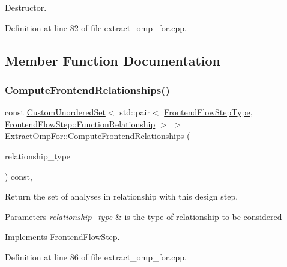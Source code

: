 Destructor. 



Definition at line 82 of file extract\+\_\+omp\+\_\+for.\+cpp.



\subsection{Member Function Documentation}
\mbox{\label{classExtractOmpFor_a915e472b3f29a1dd3aab7b9ef2cb8e83}} 
\subsubsection{\texorpdfstring{Compute\+Frontend\+Relationships()}{ComputeFrontendRelationships()}}
{\footnotesize\ttfamily const \hyperlink{classCustomUnorderedSet}{Custom\+Unordered\+Set}$<$ std\+::pair$<$ \hyperlink{frontend__flow__step_8hpp_afeb3716c693d2b2e4ed3e6d04c3b63bb}{Frontend\+Flow\+Step\+Type}, \hyperlink{classFrontendFlowStep_af7cf30f2023e5b99e637dc2058289ab0}{Frontend\+Flow\+Step\+::\+Function\+Relationship} $>$ $>$ Extract\+Omp\+For\+::\+Compute\+Frontend\+Relationships (\begin{DoxyParamCaption}\item[{const \hyperlink{classDesignFlowStep_a723a3baf19ff2ceb77bc13e099d0b1b7}{Design\+Flow\+Step\+::\+Relationship\+Type}}]{relationship\+\_\+type }\end{DoxyParamCaption}) const\hspace{0.3cm}{\ttfamily [protected]}, {\ttfamily [virtual]}}



Return the set of analyses in relationship with this design step. 


\begin{DoxyParams}{Parameters}
{\em relationship\+\_\+type} & is the type of relationship to be considered \\
\hline
\end{DoxyParams}


Implements \hyperlink{classFrontendFlowStep_abeaff70b59734e462d347ed343dd700d}{Frontend\+Flow\+Step}.



Definition at line 86 of file extract\+\_\+omp\+\_\+for.\+cpp.



